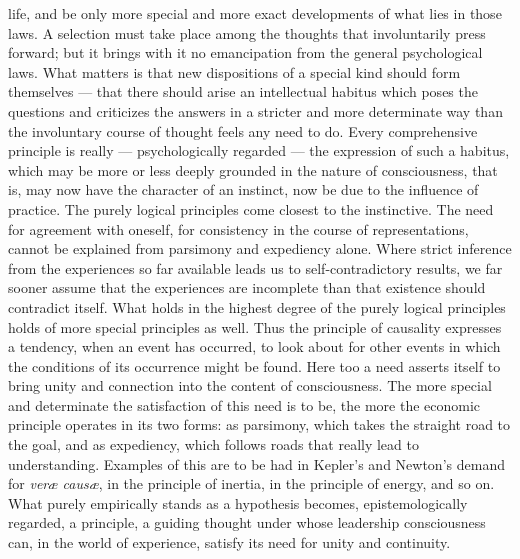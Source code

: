 \documentclass[12pt,a4paper]{book}
\newcommand{\opage}[1]{\marginnote{\footnotesize\textit{[#1]}}}
\begin{document}
life, and be only more special and more exact developments of what lies in those
laws. A selection must take place among the thoughts that involuntarily press
forward; but it brings with it no emancipation from the general psychological
laws. What matters is that new dispositions of a special kind should form
themselves --- that there should arise an intellectual habitus which poses the
questions and criticizes the answers in a stricter and more determinate way than
the involuntary course of thought feels any need to do. Every comprehensive
principle is really --- psychologically regarded --- the expression of such a
habitus, which may be more or less deeply grounded in the nature of
consciousness, that is, may now have the character of an instinct, now be due to
the influence of practice. The purely logical principles come closest to the
instinctive. The need for agreement with oneself, for consistency in the course
of representations, cannot be explained from parsimony and expediency alone.
Where strict inference from the experiences so far available leads us to
self-contradictory results, we far sooner assume that the experiences are
incomplete than that existence should contradict itself. What holds in the
highest degree of the purely logical principles holds of more special principles
as well. Thus the principle of causality expresses a tendency, when \opage{36}an event has
occurred, to look about for other events in which the conditions of its
occurrence might be found. Here too a need asserts itself to bring unity and
connection into the content of consciousness. The more special and determinate
the satisfaction of this need is to be, the more the economic principle operates
in its two forms: as parsimony, which takes the straight road to the goal, and
as expediency, which follows roads that really lead to understanding. Examples
of this are to be had in Kepler's and Newton's demand for \textit{veræ causæ},
in the principle of inertia, in the principle of energy, and so on. What purely
empirically stands as a hypothesis becomes, epistemologically regarded, a
principle, a guiding thought under whose leadership consciousness can, in the
world of experience, satisfy its need for unity and continuity.
\end{document}
